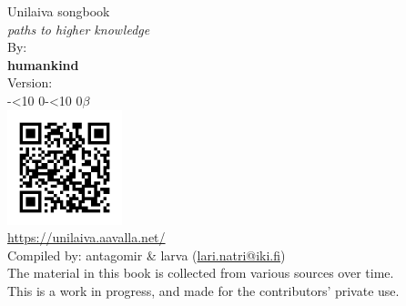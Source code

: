 \documentclass[twoside,10pt]{book}
\begin{document}
  \begin{titlepage}
    \thispagestyle{empty}
    \vspace*{\fill}
    \begin{center}
      \vspace{-1.05em} %
      \Huge Unilaiva songbook\\
      \normalsize \textit{paths to higher knowledge}\\
      \Large
      \vspace{3em}
      \large By:\\
      \Large \textbf{humankind}\\
      \vspace{1em}
      \large Version:\\
      \Large \the\year-\ifnum\month<10 0\fi\the\month-\ifnum\day<10 0\fi\the\day\hspace{0.34em}$\beta$
      \\
      \vspace*{\fill}
      \includegraphics[width=0.25\textwidth]{QR_https_unilaiva_aavalla_net.png}
      \\
      {\small\url{https://unilaiva.aavalla.net/}}
      \\
      \vspace*{\fill}
      {\footnotesize Compiled by: antagomir \& larva (\href{mailto:lari.natri@iki.fi}{lari.natri@iki.fi})}
      \\
      \vspace{1.5em}
      {\scriptsize
        The material in this book is collected from various sources over time.\\
        \vspace{-1em} %
        This is a work in progress, and made for the contributors' private use.
        \vspace{-1em} %
      }
    \end{center}
  \end{titlepage}
\end{document}
